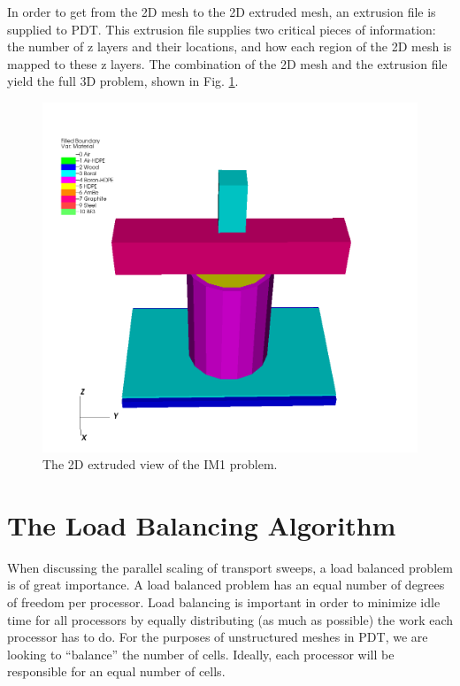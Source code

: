 \documentclass{anstrans}
\begin{document}
In order to get from the 2D mesh to the 2D extruded mesh, an extrusion file is supplied to PDT. This extrusion file supplies two critical pieces of information: the number of z layers and their locations, and how each region of the 2D mesh is mapped to these z layers. The combination of the 2D mesh and the extrusion file yield the full 3D problem, shown in Fig. \ref{IM13D}.

\begin{figure}[H]
\centering
\includegraphics[scale = 0.3]{figures/IM1_3D.png}
\caption{The 2D extruded view of the IM1 problem.}
\label{IM13D}
\end{figure}


\section{The Load Balancing Algorithm}

When discussing the parallel scaling of transport sweeps, a load balanced problem is of great importance. A load balanced problem has an equal number of degrees of freedom per processor. Load balancing is important in order to minimize idle time for all processors by equally distributing (as much as possible) the work each processor has to do.  For the purposes of unstructured meshes in PDT, we are looking to ``balance'' the number of cells. Ideally, each processor will be responsible for an equal number of cells. 
\end{document}
